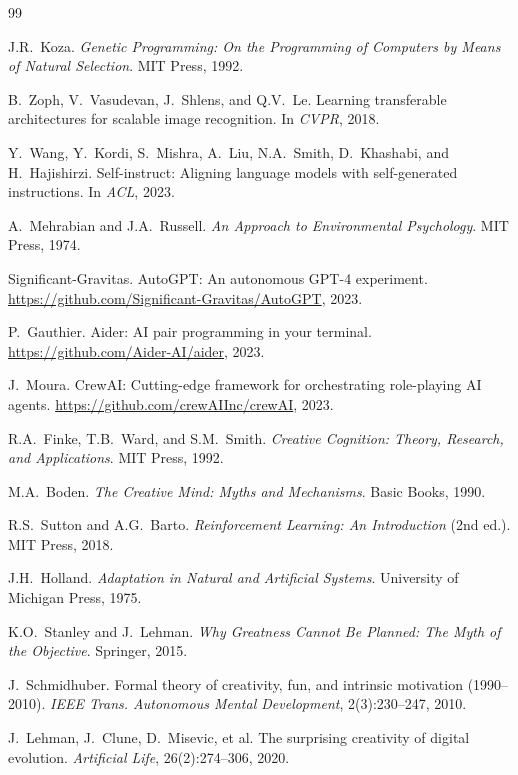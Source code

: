 \documentclass[11pt,a4paper]{article}
\begin{document}

\begin{thebibliography}{99}

J.R.~Koza.
\newblock \textit{Genetic Programming: On the Programming of Computers by Means of Natural Selection}.
\newblock MIT Press, 1992.

B.~Zoph, V.~Vasudevan, J.~Shlens, and Q.V.~Le.
\newblock Learning transferable architectures for scalable image recognition.
\newblock In \textit{CVPR}, 2018.

Y.~Wang, Y.~Kordi, S.~Mishra, A.~Liu, N.A.~Smith, D.~Khashabi, and H.~Hajishirzi.
\newblock Self-instruct: Aligning language models with self-generated instructions.
\newblock In \textit{ACL}, 2023.

A.~Mehrabian and J.A.~Russell.
\newblock \textit{An Approach to Environmental Psychology}.
\newblock MIT Press, 1974.

Significant-Gravitas.
\newblock AutoGPT: An autonomous GPT-4 experiment.
\newblock \url{https://github.com/Significant-Gravitas/AutoGPT}, 2023.

P.~Gauthier.
\newblock Aider: AI pair programming in your terminal.
\newblock \url{https://github.com/Aider-AI/aider}, 2023.

J.~Moura.
\newblock CrewAI: Cutting-edge framework for orchestrating role-playing AI agents.
\newblock \url{https://github.com/crewAIInc/crewAI}, 2023.

R.A.~Finke, T.B.~Ward, and S.M.~Smith.
\newblock \textit{Creative Cognition: Theory, Research, and Applications}.
\newblock MIT Press, 1992.

M.A.~Boden.
\newblock \textit{The Creative Mind: Myths and Mechanisms}.
\newblock Basic Books, 1990.

R.S.~Sutton and A.G.~Barto.
\newblock \textit{Reinforcement Learning: An Introduction} (2nd ed.).
\newblock MIT Press, 2018.

J.H.~Holland.
\newblock \textit{Adaptation in Natural and Artificial Systems}.
\newblock University of Michigan Press, 1975.

K.O.~Stanley and J.~Lehman.
\newblock \textit{Why Greatness Cannot Be Planned: The Myth of the Objective}.
\newblock Springer, 2015.

J.~Schmidhuber.
\newblock Formal theory of creativity, fun, and intrinsic motivation (1990--2010).
\newblock \textit{IEEE Trans. Autonomous Mental Development}, 2(3):230--247, 2010.

J.~Lehman, J.~Clune, D.~Misevic, et al.
\newblock The surprising creativity of digital evolution.
\newblock \textit{Artificial Life}, 26(2):274--306, 2020.

\end{thebibliography}
\end{document}
